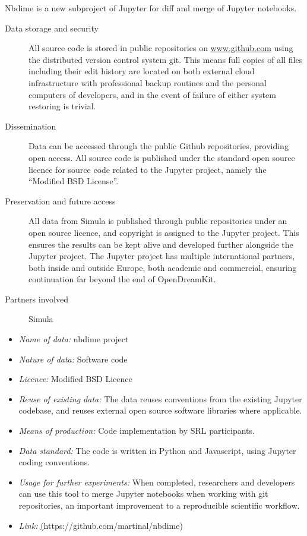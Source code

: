 \documentclass{../../Proposal/LaTeX-proposal/deliverablereport}
\begin{document}
Nbdime is a new subproject of Jupyter for diff and merge of Jupyter notebooks.
\begin{description}

\item[Data storage and security] All source code is stored in public repositories on \url{www.github.com} using the distributed version control system git. This means full copies of all files including their edit history are located on both external cloud infrastructure with professional backup routines and the personal computers of developers, and in the event of failure of either system restoring is trivial.
\item[Dissemination] Data can be accessed through the public Github repositories, providing open access. All source code is published under the standard open source licence for source code related to the Jupyter project, namely the ``Modified BSD License''.
\item[Preservation and future access] All data from Simula is published through public repositories under an open source licence, and copyright is assigned to the Jupyter project. This ensures the results can be kept alive and developed further alongside the Jupyter project. The Jupyter project has multiple international partners, both inside and outside Europe, both academic and commercial, ensuring continuation far beyond the end of OpenDreamKit.
\item[Partners involved] Simula

\end{description}

\begin{itemize}
\item\textit{Name of data:} nbdime project
\item\textit{Nature of data:} Software code
\item\textit{Licence:} Modified BSD Licence
\item\textit{Reuse of existing data:} The data reuses conventions from the existing Jupyter codebase, and reuses external open source software libraries where applicable.
\item\textit{Means of production:} Code implementation by SRL participants.
\item\textit{Data standard:} The code is written in Python and Javascript, using Jupyter coding conventions.
\item\textit{Usage for further experiments:} When completed, researchers and developers can use this tool to merge Jupyter notebooks when working with git repositories, an important improvement to a reproducible scientific workflow.
\item\textit{Link:} \href{https://github.com/martinal/nbdime}(https://github.com/martinal/nbdime)
\end{itemize}
\end{document}
